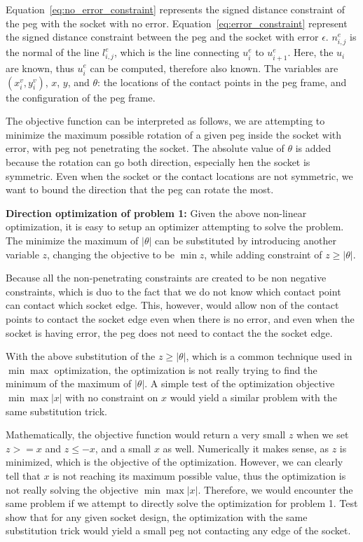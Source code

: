 \documentclass[11pt]{article}
\begin{document}
Equation~\ref{eq:no_error_constraint} represents the signed distance constraint of the peg with the socket with no error. Equation~\ref{eq:error_constraint} represent the signed distance constraint between the peg and the socket with error $\epsilon$. $n^e_{i, j}$ is the normal of the line $l^e_{i, j}$, which is the line connecting $u^e_i$ to $u^e_{i+1}$. Here, the $u_i$ are known, thus $u^e_i$ can be computed, therefore also known. The variables are $(x^v_i, y^v_i)$, $x$, $y$, and $\theta$: the locations of the contact points in the peg frame, and the configuration of the peg frame. 

The objective function can be interpreted as follows, we are attempting to minimize the maximum possible rotation of a given peg inside the socket with error, with peg not penetrating the socket. The absolute value of $\theta$ is added because the rotation can go both direction, especially hen the socket is symmetric. Even when the socket or the contact locations are not symmetric, we want to bound the direction that the peg can rotate the most. 



\noindent\textbf{Direction optimization of problem 1: } Given the above non-linear optimization, it is easy to setup an optimizer attempting to solve the problem. The minimize the maximum of $|\theta|$ can be substituted by introducing another variable $z$, changing the objective to be $\min z$, while adding constraint of $z\geq |\theta|$. 

Because all the non-penetrating constraints are created to be non negative constraints, which is duo to the fact that we do not know which contact point can contact which socket edge. This, however, would allow non of the contact points to contact the socket edge even when there is no error, and even when the socket is having error, the peg does not need to contact the the socket edge. 

With the above substitution of the $z\geq|\theta|$, which is a common technique used in $\min\max$ optimization, the optimization is not really trying to find the minimum of the maximum of $|\theta|$. A simple test of the optimization objective $\min\max |x|$ with no constraint on $x$ would yield a similar problem with the same substitution trick. 

Mathematically, the objective function would return a very small $z$ when we set $z >= x$ and $z\leq -x$, and a small $x$ as well. Numerically it makes sense, as $z$ is minimized, which is the objective of the optimization. However, we can clearly tell that $x$ is not reaching its maximum possible value, thus the optimization is not really solving the objective $\min\max |x|$. Therefore, we would encounter the same problem if we attempt to directly solve the optimization for problem 1. Test show that for any given socket design, the optimization with the same substitution trick would yield a small peg not contacting any edge of the socket. 
\end{document}
